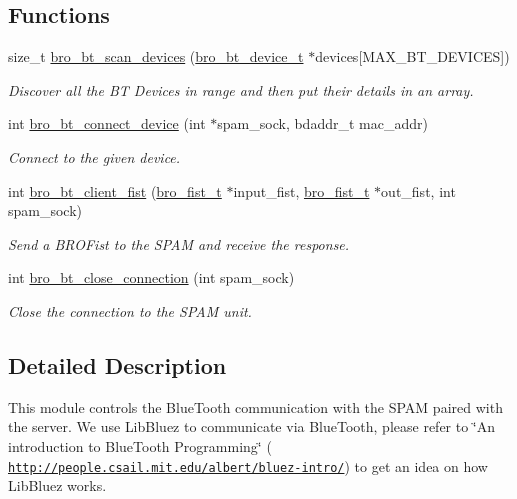 \subsection*{Functions}
\begin{DoxyCompactItemize}
\item 
size\_\-t \hyperlink{group___bro_b_t_ga4d15ac149696de8a2e530da1840cd8c3}{bro\_\-bt\_\-scan\_\-devices} (\hyperlink{structbro__bt__device__t}{bro\_\-bt\_\-device\_\-t} $\ast$devices\mbox{[}MAX\_\-BT\_\-DEVICES\mbox{]})
\begin{DoxyCompactList}\small\item\em Discover all the BT Devices in range and then put their details in an array. \item\end{DoxyCompactList}\item 
int \hyperlink{group___bro_b_t_ga3782811f033f57a69b10be399da70207}{bro\_\-bt\_\-connect\_\-device} (int $\ast$spam\_\-sock, bdaddr\_\-t mac\_\-addr)
\begin{DoxyCompactList}\small\item\em Connect to the given device. \item\end{DoxyCompactList}\item 
int \hyperlink{group___bro_b_t_gafe494b1180377249a86e62f44a95638b}{bro\_\-bt\_\-client\_\-fist} (\hyperlink{structbro__fist__t}{bro\_\-fist\_\-t} $\ast$input\_\-fist, \hyperlink{structbro__fist__t}{bro\_\-fist\_\-t} $\ast$out\_\-fist, int spam\_\-sock)
\begin{DoxyCompactList}\small\item\em Send a BROFist to the SPAM and receive the response. \item\end{DoxyCompactList}\item 
int \hyperlink{group___bro_b_t_ga7e4a6289129f5f2a9d3c87619629dac8}{bro\_\-bt\_\-close\_\-connection} (int spam\_\-sock)
\begin{DoxyCompactList}\small\item\em Close the connection to the SPAM unit. \item\end{DoxyCompactList}\end{DoxyCompactItemize}


\subsection{Detailed Description}
This module controls the BlueTooth communication with the SPAM paired with the server. We use {\ttfamily LibBluez} to communicate via BlueTooth, please refer to \char`\"{}An introduction to BlueTooth Programming\char`\"{} ( \href{http://people.csail.mit.edu/albert/bluez-intro/}{\tt http://people.csail.mit.edu/albert/bluez-\/intro/}) to get an idea on how {\ttfamily LibBluez} works. 

